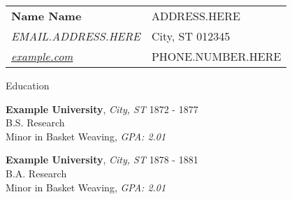 \documentclass{structure} %
\begin{document}

\begin{center}
\begin{tabular}{ll}
  {\huge {\bf Name Name}} & ADDRESS.HERE\\
  {\it EMAIL.ADDRESS.HERE} & City, ST 012345\\
  {\it \href{http://www.example.com}{example.com}} & PHONE.NUMBER.HERE
\end{tabular}
\end{center}


\begin{rSection}{Education}

{\bf Example University}, {\it City, ST} \hfill { 1872 - 1877} \\
B.S. Research \\
Minor in Basket Weaving, {\it GPA: 2.01}

{\bf Example University}, {\it City, ST} \hfill { 1878 - 1881} \\
B.A. Research \\
Minor in Basket Weaving, {\it GPA: 2.01}

\end{rSection}

\end{document}
